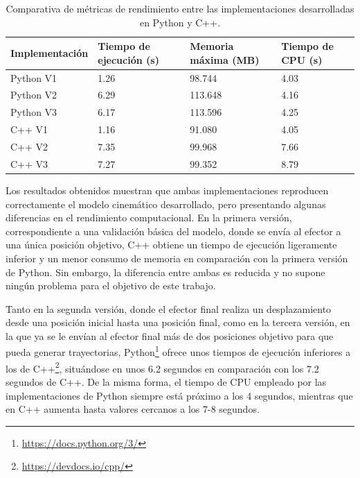 \begin{table}[htbp]
    \centering
    \label{tab:mi_tabla}
    \begin{tabularx}{\textwidth}{@{}X X X X @{}}
        \toprule
        Implementación & Tiempo de ejecución (s) & Memoria máxima (MB) & Tiempo de CPU (s) \\
        \midrule
        Python V1 & 1.26 & 98.744 & 4.03\newline \\
        Python V2 & 6.29 & 113.648 & 4.16\newline \\
        Python V3 & 6.17 & 113.596 & 4.25\newline \\
        C++ V1 & 1.16 & 91.080 & 4.05\newline \\
        C++ V2 & 7.35 & 99.968 & 7.66\newline \\
        C++ V3 & 7.27 & 99.352 & 8.79\\
        \bottomrule
    \end{tabularx}
    \caption{Comparativa de métricas de rendimiento entre las implementaciones desarrolladas en Python y C++.}
\end{table}

Los resultados obtenidos muestran que ambas implementaciones reproducen correctamente el modelo cinemático desarrollado, pero presentando algunas diferencias en el rendimiento computacional. En la primera versión, correspondiente a una validación básica del modelo, donde se envía al efector a una única posición objetivo, C++ obtiene un tiempo de ejecución ligeramente inferior y un menor consumo de memoria en comparación con la primera versión de Python. Sin embargo, la diferencia entre ambas es reducida y no supone ningún problema para el objetivo de este trabajo.

\newpage

Tanto en la segunda versión, donde el efector final realiza un desplazamiento desde una posición inicial hasta una posición final, como en la tercera versión, en la que ya se le envían al efector final más de dos posiciones objetivo para que pueda generar trayectorias, Python\footnote{\url{https://docs.python.org/3/}} ofrece unos tiempos de ejecución inferiores a los de C++\footnote{\url{https://devdocs.io/cpp/}}, situándose en unos 6.2 segundos en comparación con los 7.2 segundos de C++. De la misma forma, el tiempo de CPU empleado por las implementaciones de Python siempre está próximo a los 4 segundos, mientras que en C++ aumenta hasta valores cercanos a los 7-8 segundos.

